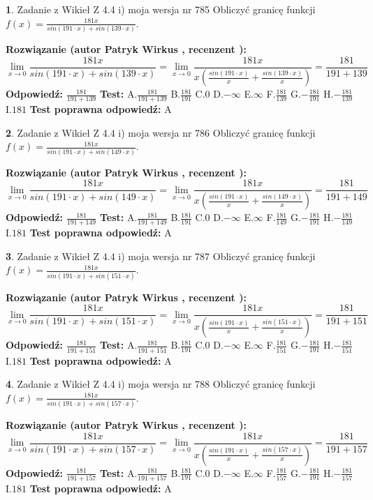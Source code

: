 \documentclass[12pt, a4paper]{article}
\theoremstyle{definition} %
\newtheorem{zad}{}
\newcommand{\zadStart}[1]{\begin{zad}#1\newline}
\newcommand{\zadStop}{\end{zad}}
\newcommand{\rozwStart}[2]{\noindent \textbf{Rozwiązanie (autor #1 , recenzent #2): }\newline}
\newcommand{\rozwStop}{\newline}
\newcommand{\odpStart}{\noindent \textbf{Odpowiedź:}\newline}
\newcommand{\odpStop}{\newline}
\newcommand{\testStart}{\noindent \textbf{Test:}\newline}
\newcommand{\testStop}{\newline}
\newcommand{\kluczStart}{\noindent \textbf{Test poprawna odpowiedź:}\newline}
\newcommand{\kluczStop}{\newline}
\begin{document}
\zadStart{Zadanie z Wikieł Z 4.4 i) moja wersja nr 785}
Obliczyć granicę funkcji $f(x)=\frac{181x}{sin(191\cdot x) +sin(139\cdot x)}$.
\zadStop
\rozwStart{Patryk Wirkus}{}
$$\lim\limits_{x\to 0}\frac{181x}{sin(191\cdot x) +sin(139\cdot x)}=\lim\limits_{x\to 0}\frac{181x}{x(\frac{sin(191\cdot x)}{x}+\frac{sin(139\cdot x)}{x})}=\frac{181}{191+139}$$
\rozwStop
\odpStart
$\frac{181}{191+139}$
\odpStop
\testStart
A.$\frac{181}{191+139}$
B.$\frac{181}{191}$
C.$0$
D.$-\infty$
E.$\infty$
F.$\frac{181}{139}$
G.$-\frac{181}{191}$
H.$-\frac{181}{139}$
I.$181$
\testStop
\kluczStart
A
\kluczStop



\zadStart{Zadanie z Wikieł Z 4.4 i) moja wersja nr 786}
Obliczyć granicę funkcji $f(x)=\frac{181x}{sin(191\cdot x) +sin(149\cdot x)}$.
\zadStop
\rozwStart{Patryk Wirkus}{}
$$\lim\limits_{x\to 0}\frac{181x}{sin(191\cdot x) +sin(149\cdot x)}=\lim\limits_{x\to 0}\frac{181x}{x(\frac{sin(191\cdot x)}{x}+\frac{sin(149\cdot x)}{x})}=\frac{181}{191+149}$$
\rozwStop
\odpStart
$\frac{181}{191+149}$
\odpStop
\testStart
A.$\frac{181}{191+149}$
B.$\frac{181}{191}$
C.$0$
D.$-\infty$
E.$\infty$
F.$\frac{181}{149}$
G.$-\frac{181}{191}$
H.$-\frac{181}{149}$
I.$181$
\testStop
\kluczStart
A
\kluczStop



\zadStart{Zadanie z Wikieł Z 4.4 i) moja wersja nr 787}
Obliczyć granicę funkcji $f(x)=\frac{181x}{sin(191\cdot x) +sin(151\cdot x)}$.
\zadStop
\rozwStart{Patryk Wirkus}{}
$$\lim\limits_{x\to 0}\frac{181x}{sin(191\cdot x) +sin(151\cdot x)}=\lim\limits_{x\to 0}\frac{181x}{x(\frac{sin(191\cdot x)}{x}+\frac{sin(151\cdot x)}{x})}=\frac{181}{191+151}$$
\rozwStop
\odpStart
$\frac{181}{191+151}$
\odpStop
\testStart
A.$\frac{181}{191+151}$
B.$\frac{181}{191}$
C.$0$
D.$-\infty$
E.$\infty$
F.$\frac{181}{151}$
G.$-\frac{181}{191}$
H.$-\frac{181}{151}$
I.$181$
\testStop
\kluczStart
A
\kluczStop



\zadStart{Zadanie z Wikieł Z 4.4 i) moja wersja nr 788}
Obliczyć granicę funkcji $f(x)=\frac{181x}{sin(191\cdot x) +sin(157\cdot x)}$.
\zadStop
\rozwStart{Patryk Wirkus}{}
$$\lim\limits_{x\to 0}\frac{181x}{sin(191\cdot x) +sin(157\cdot x)}=\lim\limits_{x\to 0}\frac{181x}{x(\frac{sin(191\cdot x)}{x}+\frac{sin(157\cdot x)}{x})}=\frac{181}{191+157}$$
\rozwStop
\odpStart
$\frac{181}{191+157}$
\odpStop
\testStart
A.$\frac{181}{191+157}$
B.$\frac{181}{191}$
C.$0$
D.$-\infty$
E.$\infty$
F.$\frac{181}{157}$
G.$-\frac{181}{191}$
H.$-\frac{181}{157}$
I.$181$
\testStop
\kluczStart
A
\kluczStop
\end{document}
